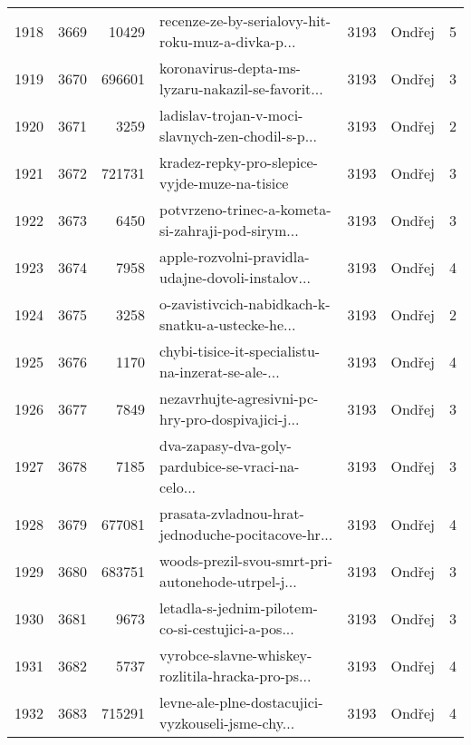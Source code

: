 \begin{tabular}{lrrlrlr}
1918 &       3669 &    10429 &  recenze-ze-by-serialovy-hit-roku-muz-a-divka-p... &     3193 &                       Ondřej &               5 \\
1919 &       3670 &   696601 &  koronavirus-depta-ms-lyzaru-nakazil-se-favorit... &     3193 &                       Ondřej &               3 \\
1920 &       3671 &     3259 &  ladislav-trojan-v-moci-slavnych-zen-chodil-s-p... &     3193 &                       Ondřej &               2 \\
1921 &       3672 &   721731 &      kradez-repky-pro-slepice-vyjde-muze-na-tisice &     3193 &                       Ondřej &               3 \\
1922 &       3673 &     6450 &  potvrzeno-trinec-a-kometa-si-zahraji-pod-sirym... &     3193 &                       Ondřej &               3 \\
1923 &       3674 &     7958 &  apple-rozvolni-pravidla-udajne-dovoli-instalov... &     3193 &                       Ondřej &               4 \\
1924 &       3675 &     3258 &  o-zavistivcich-nabidkach-k-snatku-a-ustecke-he... &     3193 &                       Ondřej &               2 \\
1925 &       3676 &     1170 &  chybi-tisice-it-specialistu-na-inzerat-se-ale-... &     3193 &                       Ondřej &               4 \\
1926 &       3677 &     7849 &  nezavrhujte-agresivni-pc-hry-pro-dospivajici-j... &     3193 &                       Ondřej &               3 \\
1927 &       3678 &     7185 &  dva-zapasy-dva-goly-pardubice-se-vraci-na-celo... &     3193 &                       Ondřej &               3 \\
1928 &       3679 &   677081 &  prasata-zvladnou-hrat-jednoduche-pocitacove-hr... &     3193 &                       Ondřej &               4 \\
1929 &       3680 &   683751 &  woods-prezil-svou-smrt-pri-autonehode-utrpel-j... &     3193 &                       Ondřej &               3 \\
1930 &       3681 &     9673 &  letadla-s-jednim-pilotem-co-si-cestujici-a-pos... &     3193 &                       Ondřej &               3 \\
1931 &       3682 &     5737 &  vyrobce-slavne-whiskey-rozlitila-hracka-pro-ps... &     3193 &                       Ondřej &               4 \\
1932 &       3683 &   715291 &  levne-ale-plne-dostacujici-vyzkouseli-jsme-chy... &     3193 &                       Ondřej &               4 \\

\end{tabular}
